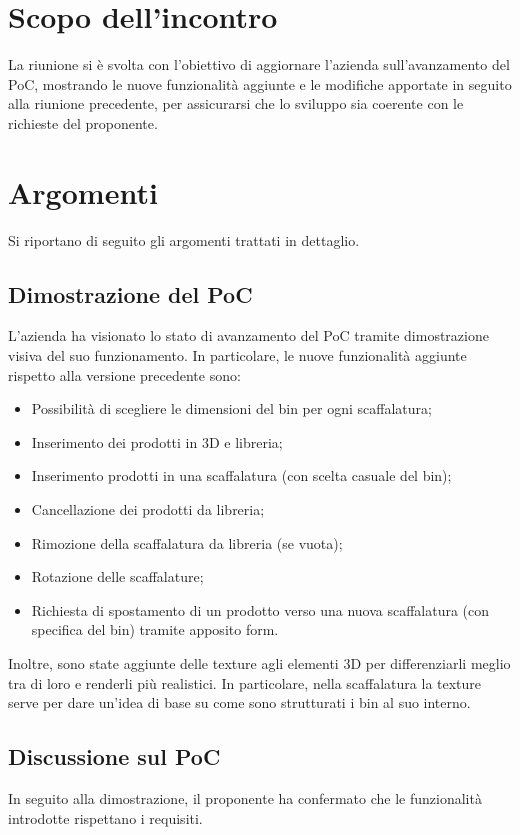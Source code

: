 \section{Scopo dell'incontro} \label{sec:scopo}
La riunione si è svolta con l'obiettivo di aggiornare l'azienda \nomeAzienda \space sull'avanzamento del PoC, mostrando le nuove funzionalità aggiunte e le modifiche apportate in seguito alla riunione precedente, per assicurarsi che lo sviluppo sia coerente con le richieste del proponente. 

\section{Argomenti} \label{sec:argomenti}
\noindent Si riportano di seguito gli argomenti trattati in dettaglio.

\subsection{Dimostrazione del PoC}
L'azienda ha visionato lo stato di avanzamento del PoC tramite dimostrazione visiva del suo funzionamento. In particolare, le nuove funzionalità aggiunte rispetto alla versione precedente sono:
\begin{itemize}
    \item Possibilità di scegliere le dimensioni del bin per ogni scaffalatura;
    \item Inserimento dei prodotti in 3D e libreria;
    \item Inserimento prodotti in una scaffalatura (con scelta casuale del bin);
    \item Cancellazione dei prodotti da libreria;
    \item Rimozione della scaffalatura da libreria (se vuota);
    \item Rotazione delle scaffalature;
    \item Richiesta di spostamento di un prodotto verso una nuova scaffalatura (con specifica del bin) tramite apposito form.    
\end{itemize}
\noindent Inoltre, sono state aggiunte delle texture agli elementi 3D per differenziarli meglio tra di loro e renderli più realistici. In particolare, nella scaffalatura la texture serve per dare un'idea di base su come sono strutturati i bin al suo interno.

\subsection{Discussione sul PoC}
In seguito alla dimostrazione, il proponente ha confermato che le funzionalità introdotte rispettano i requisiti.
